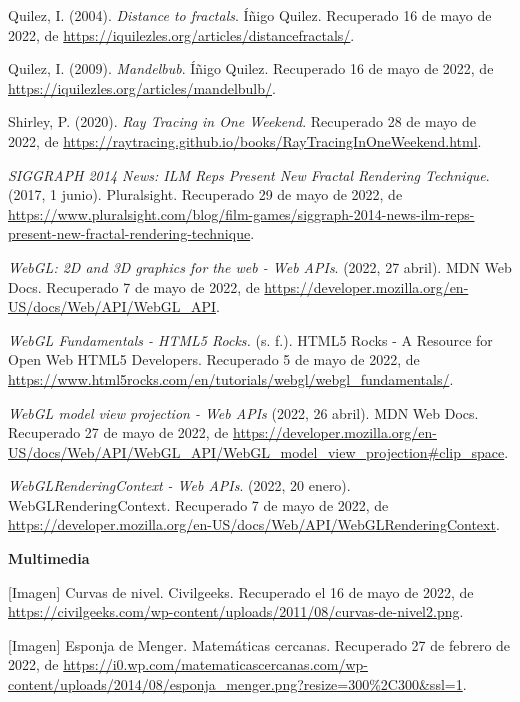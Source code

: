 \begin{thebibliography}{99}
     Quilez, I. (2004). \textit{Distance to fractals}. Íñigo Quilez. Recuperado 16 de mayo de 2022, de \url{https://iquilezles.org/articles/distancefractals/}.

     Quilez, I. (2009). \textit{Mandelbub}. Íñigo Quilez. Recuperado 16 de mayo de 2022, de \url{https://iquilezles.org/articles/mandelbulb/}.

     Shirley, P. (2020). \textit{Ray Tracing in One Weekend}. Recuperado 28 de mayo de 2022, de \url{https://raytracing.github.io/books/RayTracingInOneWeekend.html}.

     \textit{SIGGRAPH 2014 News: ILM Reps Present New Fractal Rendering Technique}. (2017, 1 junio). Pluralsight. Recuperado 29 de mayo de 2022, de \url{https://www.pluralsight.com/blog/film-games/siggraph-2014-news-ilm-reps-present-new-fractal-rendering-technique}.

     \textit{WebGL: 2D and 3D graphics for the web - Web APIs}. (2022, 27 abril). MDN Web Docs. Recuperado 7 de mayo de 2022, de \url{https://developer.mozilla.org/en-US/docs/Web/API/WebGL_API}.

     \textit{WebGL Fundamentals - HTML5 Rocks.} (s. f.). HTML5 Rocks - A Resource for Open Web HTML5 Developers. Recuperado 5 de mayo de 2022, de \url{https://www.html5rocks.com/en/tutorials/webgl/webgl_fundamentals/}.

     \textit{WebGL model view projection - Web APIs} (2022, 26 abril). MDN Web Docs. Recuperado 27 de mayo de 2022, de \url{https://developer.mozilla.org/en-US/docs/Web/API/WebGL_API/WebGL_model_view_projection#clip_space}.

     \textit{WebGLRenderingContext - Web APIs}. (2022, 20 enero). WebGLRenderingContext. Recuperado 7 de mayo de 2022, de \url{https://developer.mozilla.org/en-US/docs/Web/API/WebGLRenderingContext}.

\vspace{1cm}

\textbf{{\Large Multimedia}}

     [Imagen] Curvas de nivel. Civilgeeks. Recuperado el 16 de mayo de 2022, de \url{https://civilgeeks.com/wp-content/uploads/2011/08/curvas-de-nivel2.png}.

     [Imagen] Esponja de Menger. Matemáticas cercanas. Recuperado 27 de febrero de 2022, de \url{https://i0.wp.com/matematicascercanas.com/wp-content/uploads/2014/08/esponja_menger.png?resize=300%2C300&ssl=1}.


\end{thebibliography}
